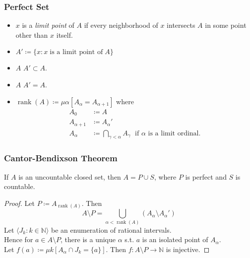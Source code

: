 \documentclass[UTF8,aspectratio=43,11pt,colorlinks,compress,openany]{beamer}%
\begin{document}
\begin{frame}\frametitle{Perfect Set}
	\begin{itemize}
		\item $x$ is a \emph{limit point} of $A$ if every neighborhood of $x$ intersects $A$ in some point other than $x$ itself.
		\item $A'\coloneqq \big\{x: x\;\text{is a limit point of}\;A\big\}$
		\item $A$  $A'\subset A$.
		\item $A$  $A'=A.$
		\begin{center}
		\end{center}
		\item $\operatorname{rank}(A)\coloneqq \mu\alpha[A_\alpha=A_{\alpha+1}]$ where
		\begin{align*}
		A_0&\coloneqq A\\
		A_{\alpha+1}&\coloneqq A_\alpha'\\
		A_\alpha&\coloneqq \bigcap\limits_{\gamma<\alpha}A_\gamma\;\mbox{ if $\alpha$ is a limit ordinal.}
		\end{align*}
	\end{itemize}
\end{frame}

\begin{frame}\frametitle{Cantor-Bendixson Theorem}
	\begin{theorem}
		If $A$ is an uncountable closed set, then $A=P\cup S$, where $P$ is perfect and $S$ is countable.
	\end{theorem}\vspace{-1ex}
	\begin{proof}
		Let $P\coloneqq A_{\operatorname{rank}(A)}$.
		Then
		\[A\setminus P=\bigcup\limits_{\alpha<\operatorname{rank}(A)}\left(A_\alpha\setminus A_\alpha'\right)\]
		Let $\langle J_k: k\in\mathbb{N}\rangle$ be an enumeration of rational intervals.\\
		Hence for $a\in A\setminus P$, there is a unique $\alpha$ s.t. $a$ is an isolated point of $A_\alpha$.\\
		Let $f(a)\coloneqq \mu k[A_\alpha\cap J_k=\{a\}]$. Then $f: A\setminus P\to\mathbb{N}$ is injective.
	\end{proof}
\end{frame}
\end{document}
